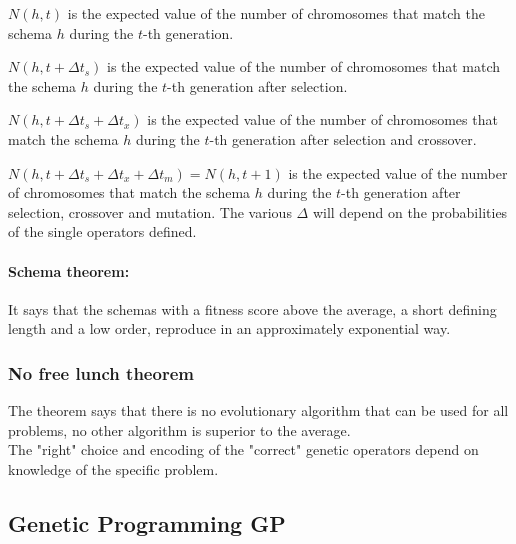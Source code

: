 \begin{definition}
	$N(h,t)$ is the expected value of the number of chromosomes that match the schema $h$ during the $t$-th generation.\\
\end{definition}

\begin{definition}
	$N(h, t + \Delta t_s)$ is the expected value of the number of chromosomes that match the schema $h$ during the $t$-th generation after selection.\\
\end{definition}

\begin{definition}
	$N(h, t + \Delta t_s + \Delta t_x)$ is the expected value of the number of chromosomes that match the schema $h$ during the $t$-th generation after selection and crossover.\\
\end{definition}

\begin{definition}
	$N(h, t + \Delta t_s + \Delta t_x + \Delta t_m) = N(h, t+1)$ is the expected value of the number of chromosomes that match the schema $h$ during the $t$-th generation after selection, crossover and mutation. The various $\Delta$ will depend on the probabilities of the single operators defined.\\
\end{definition}

\paragraph{Schema theorem:} It says that the schemas with a fitness score above the average, a short defining length and a low order, reproduce in an approximately exponential way.\\

\subsubsection{No free lunch theorem}
The theorem says that there is no evolutionary algorithm that can be used for all problems, no other algorithm is superior to the average.\\
The "right" choice and encoding of the "correct" genetic operators depend on knowledge of the specific problem. \\

\subsection{Genetic Programming GP}

